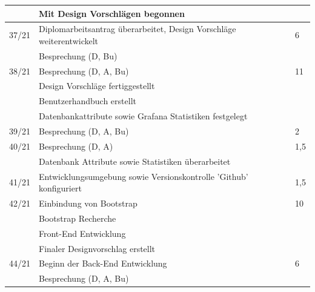 \begin{table}[h]
\begin{tabular}{|l|l|l|}
		& Mit Design Vorschlägen begonnen &	\\ \hline
		37/21   &Diplomarbeitsantrag überarbeitet, Design Vorschläge weiterentwickelt& 6 \\ 
		& Besprechung (D, Bu) &	\\ \hline
			38/21   &Besprechung (D, A, Bu) & 11\\ 
		& Design Vorschläge fertiggestellt&	\\ 
			& Benutzerhandbuch erstellt&	\\
				&Datenbankattribute sowie Grafana Statistiken festgelegt&	\\   \hline
				39/21   &Besprechung (D, A, Bu)& 2\\  \hline
				40/21   &Besprechung (D, A)& 1,5 \\ 
				& Datenbank Attribute sowie Statistiken überarbeitet &	\\ \hline
				
				41/21   &Entwicklungsumgebung sowie Versionskontrolle 'Github' konfiguriert& 1,5\\  \hline
				
				42/21   &Einbindung von Bootstrap& 10 \\ 
				& Bootstrap Recherche &	\\
				& Front-End Entwicklung &	\\	 
					& Finaler Designvorschlag erstellt&	\\\hline
					
					
					
					44/21   &Beginn der Back-End Entwicklung& 6 \\ 
					& Besprechung (D, A, Bu) &	\\ \hline
				
				
		
		
		
		
		
		
	\end{tabular}
\end{table}

